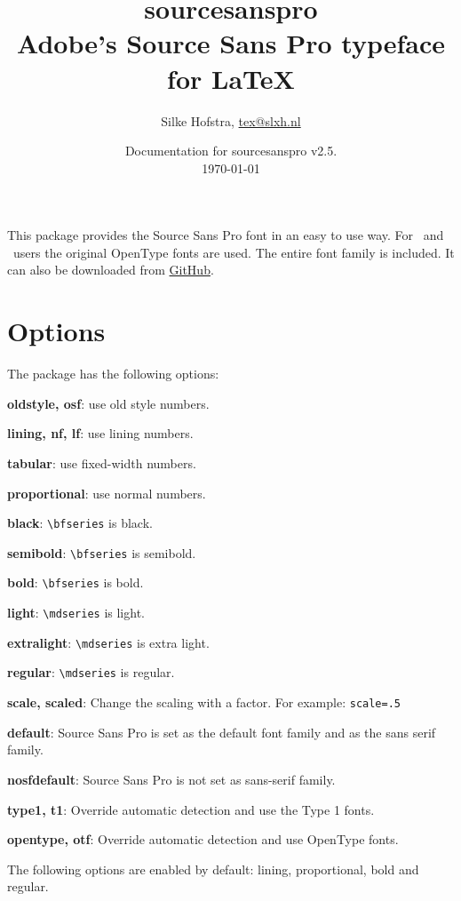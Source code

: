 \documentclass[10pt,a4paper,english]{article}
\title{\bfseries
	\Huge sourcesanspro\\
	\Large Adobe's Source Sans Pro typeface for \LaTeX
}
\author{Silke Hofstra, \href{mailto:tex@slxh.nl}{tex@slxh.nl}}
\date{Documentation for sourcesanspro v2.5.\\ \today}
\begin{document}
\maketitle
\begin{multicols}{2}
This package provides the Source Sans Pro font in an easy to use way. For \XeLaTeX\ and \LuaLaTeX\ users the original OpenType fonts are used. The entire font family is included. It can also be downloaded from \href{https://github.com/adobe-fonts/source-sans-pro}{GitHub}.

\section{Options}
The package has the following options:
\begin{itemize*}
	\item \textbf{oldstyle, osf}:  use old style numbers.
	\item \textbf{lining, nf, lf}: use lining numbers.
	\item \textbf{tabular}:        use fixed-width numbers.
	\item \textbf{proportional}:   use normal numbers.
	\item \textbf{black}:          \texttt{\textbackslash bfseries} is black.
	\item \textbf{semibold}:       \texttt{\textbackslash bfseries} is semibold.
	\item \textbf{bold}:           \texttt{\textbackslash bfseries} is bold.
	\item \textbf{light}:          \texttt{\textbackslash mdseries} is light.
	\item \textbf{extralight}:     \texttt{\textbackslash mdseries} is extra light.
	\item \textbf{regular}:        \texttt{\textbackslash mdseries} is regular.
	\item \textbf{scale, scaled}:  Change the scaling with a factor. For example:  \texttt{scale=.5}
	\item \textbf{default}:        Source Sans Pro is set as the default font family and as the sans serif family.
	\item \textbf{nosfdefault}:    Source Sans Pro is not set as sans-serif family.
	\item \textbf{type1, t1}:      Override automatic detection and use the Type 1 fonts.
	\item \textbf{opentype, otf}:  Override automatic detection and use OpenType fonts.
\end{itemize*}
The following options are enabled by default: lining, proportional, bold and regular.


\end{multicols}
\end{document}

